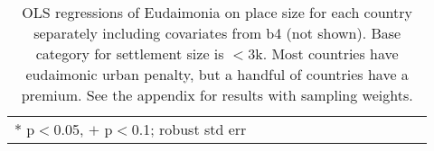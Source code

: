\documentclass[11pt, letterpaper]{article}
\begin{document}
\begin{spacing}{1.9}
\begin{spacing}{.9} \begin{table}[H]\centering   \begin{scriptsize} \begin{tabular}{p{.5in}p{.5in}p{.5in}p{.5in}p{.5in}p{.5in}p{.5in}p{.5in}p{.5in}p{.5in}p{.5
                                                                      in}p{.5in}p{.5
                                                                      in}}\hline
                                                                      
                                                                      \hline *
                                                                      p$<$0.05,
                                                                      $+$
                                                                      p$<$0.1;
                                                                      robust std
                                                                      err \end{tabular}\end{scriptsize}\caption{\label{b4cou}OLS
                                                                    regressions
                                                                    of Eudaimonia on
                                                                    place size
                                                                    for each
                                                                    country
                                                                    separately
                                                                    including
                                                                    covariates
                                                                    from b4 (not
                                                                    shown). Base category for settlement size is $<$3k.  Most
                                                                    countries
                                                                    have 
                                                                    eudaimonic
                                                                    urban
                                                                    penalty, but
                                                                    a
                                                                    handful of
                                                                    countries
                                                                    have a 
                                                                    premium. See
                                                                    the appendix
                                                                    for results with sampling weights.%
                                                           }\end{table} \end{spacing}






\end{spacing}
\end{document}
